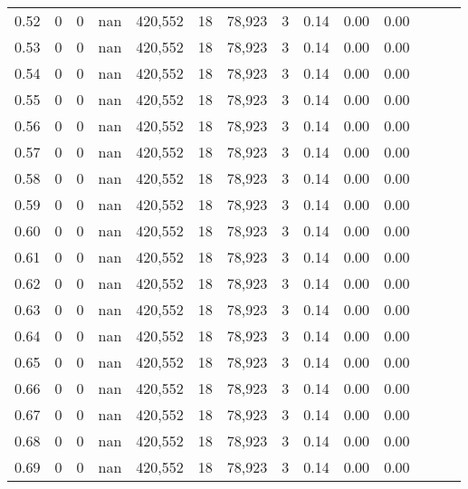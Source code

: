 \begin{tabular}{rrrrrrrrrrrrrr}
0.52 &       0 &       0 &   nan &  420,552 &       18 &  78,923 &       3 &  0.14 &  0.00 &      0.00 \\
0.53 &       0 &       0 &   nan &  420,552 &       18 &  78,923 &       3 &  0.14 &  0.00 &      0.00 \\
0.54 &       0 &       0 &   nan &  420,552 &       18 &  78,923 &       3 &  0.14 &  0.00 &      0.00 \\
0.55 &       0 &       0 &   nan &  420,552 &       18 &  78,923 &       3 &  0.14 &  0.00 &      0.00 \\
0.56 &       0 &       0 &   nan &  420,552 &       18 &  78,923 &       3 &  0.14 &  0.00 &      0.00 \\
0.57 &       0 &       0 &   nan &  420,552 &       18 &  78,923 &       3 &  0.14 &  0.00 &      0.00 \\
0.58 &       0 &       0 &   nan &  420,552 &       18 &  78,923 &       3 &  0.14 &  0.00 &      0.00 \\
0.59 &       0 &       0 &   nan &  420,552 &       18 &  78,923 &       3 &  0.14 &  0.00 &      0.00 \\
0.60 &       0 &       0 &   nan &  420,552 &       18 &  78,923 &       3 &  0.14 &  0.00 &      0.00 \\
0.61 &       0 &       0 &   nan &  420,552 &       18 &  78,923 &       3 &  0.14 &  0.00 &      0.00 \\
0.62 &       0 &       0 &   nan &  420,552 &       18 &  78,923 &       3 &  0.14 &  0.00 &      0.00 \\
0.63 &       0 &       0 &   nan &  420,552 &       18 &  78,923 &       3 &  0.14 &  0.00 &      0.00 \\
0.64 &       0 &       0 &   nan &  420,552 &       18 &  78,923 &       3 &  0.14 &  0.00 &      0.00 \\
0.65 &       0 &       0 &   nan &  420,552 &       18 &  78,923 &       3 &  0.14 &  0.00 &      0.00 \\
0.66 &       0 &       0 &   nan &  420,552 &       18 &  78,923 &       3 &  0.14 &  0.00 &      0.00 \\
0.67 &       0 &       0 &   nan &  420,552 &       18 &  78,923 &       3 &  0.14 &  0.00 &      0.00 \\
0.68 &       0 &       0 &   nan &  420,552 &       18 &  78,923 &       3 &  0.14 &  0.00 &      0.00 \\
0.69 &       0 &       0 &   nan &  420,552 &       18 &  78,923 &       3 &  0.14 &  0.00 &      0.00 \\

\end{tabular}
